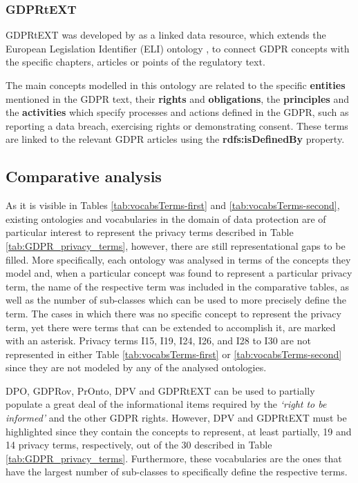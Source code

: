 \subsubsection{GDPRtEXT}
\label{sec:gdprtext}

GDPRtEXT was developed by \cite{gangemi_gdprtext_2018} as a linked data resource, which extends the European Legislation Identifier (ELI) ontology \citep{office_of_publications_on_eur-lex_eu_2017}, to connect GDPR concepts with the specific chapters, articles or points of the regulatory text.

The main concepts modelled in this ontology are related to the specific \textbf{entities} mentioned in the GDPR text, their \textbf{rights} and \textbf{obligations}, the \textbf{principles} and the \textbf{activities} which specify processes and actions defined in the GDPR, such as reporting a data breach, exercising rights or demonstrating consent.
These terms are linked to the relevant GDPR articles using the \textbf{rdfs:isDefinedBy} property.

\subsection{Comparative analysis}
\label{sec:sota_vocabularies_analysis}


As it is visible in Tables \ref{tab:vocabsTerms-first} and \ref{tab:vocabsTerms-second}, existing ontologies and vocabularies in the domain of data protection are of particular interest to represent the privacy terms described in Table \ref{tab:GDPR_privacy_terms}, however, there are still representational gaps to be filled.
More specifically, each ontology was analysed in terms of the concepts they model and, when a particular concept was found to represent a particular privacy term, the name of the respective term was included in the comparative tables, as well as the number of sub-classes which can be used to more precisely define the term.
The cases in which there was no specific concept to represent the privacy term, yet there were terms that can be extended to accomplish it, are marked with an asterisk. %
Privacy terms I15, I19, I24, I26, and I28 to I30 are not represented in either Table \ref{tab:vocabsTerms-first} or \ref{tab:vocabsTerms-second} since they are not modeled by any of the analysed ontologies. %

DPO, GDPRov, PrOnto, DPV and GDPRtEXT can be used to partially populate a great deal of the informational items required by the \textit{`right to be informed'} and the other GDPR rights. %
However, DPV and GDPRtEXT must be highlighted since they contain the concepts to represent, at least partially, 19 and 14 privacy terms, respectively, out of the 30 described in Table \ref{tab:GDPR_privacy_terms}.
Furthermore, these vocabularies are the ones that have the largest number of sub-classes to specifically define the respective terms. %

